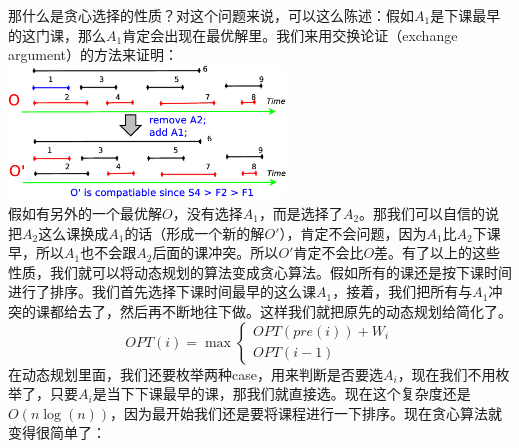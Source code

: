 	那什么是贪心选择的性质？对这个问题来说，可以这么陈述：假如$A_1$是下课最早的这门课，那么$A_1$肯定会出现在最优解里。我们来用交换论证（exchange argument）的方法来证明：\\
	 \includegraphics[width=2.9in] {L7-intervalschedulingexampleall1am.eps}\\
	假如有另外的一个最优解$O$，没有选择$A_1$，而是选择了$A_2$。那我们可以自信的说把$A_2$这么课换成$A_1$的话（形成一个新的解$O'$），肯定不会问题，因为$A_1$比$A_2$下课早，所以$A_1$也不会跟$A_2$后面的课冲突。所以$O'$肯定不会比$O$差。有了以上的这些性质，我们就可以将动态规划的算法变成贪心算法。假如所有的课还是按下课时间进行了排序。我们首先选择下课时间最早的这么课$A_1$，接着，我们把所有与$A_1$冲突的课都给去了，然后再不断地往下做。这样我们就把原先的动态规划给简化了。
	\[OPT(i) = \max \begin{cases}
	OPT( pre(i) ) + W_i \nonumber\\
	OPT( i-1) \nonumber 
	\end{cases}\]
	在动态规划里面，我们还要枚举两种case，用来判断是否要选$A_i$，现在我们不用枚举了，只要$A_i$是当下下课最早的课，那我们就直接选。现在这个复杂度还是$O(n\log(n))$，因为最开始我们还是要将课程进行一下排序。现在贪心算法就变得很简单了：
